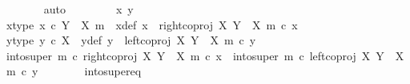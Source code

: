\begin{isabellebody}
\ \ \ \ \ \ \isamarkupfalse%
\ auto\isanewline
\ \ \isamarkupfalse%
\isanewline
\ \ \ \ \isamarkupfalse%
\ x{\isacharprime}{\kern0pt}\ y{\isacharprime}{\kern0pt}\isanewline
\ \ \ \ \isamarkupfalse%
\ x{\isacharprime}{\kern0pt}{\isacharunderscore}{\kern0pt}type{\isacharcolon}{\kern0pt}\ {\isachardoublequoteopen}x{\isacharprime}{\kern0pt}\ {\isasymin}\isactrlsub c\ Y\ {\isasymsetminus}\ {\isacharparenleft}{\kern0pt}X{\isacharcomma}{\kern0pt}\ m{\isacharparenright}{\kern0pt}{\isachardoublequoteclose}\ \ x{\isacharunderscore}{\kern0pt}def{\isacharcolon}{\kern0pt}\ {\isachardoublequoteopen}x\ {\isacharequal}{\kern0pt}\ right{\isacharunderscore}{\kern0pt}coproj\ X\ {\isacharparenleft}{\kern0pt}Y\ {\isasymsetminus}\ {\isacharparenleft}{\kern0pt}X{\isacharcomma}{\kern0pt}\ m{\isacharparenright}{\kern0pt}{\isacharparenright}{\kern0pt}\ {\isasymcirc}\isactrlsub c\ x{\isacharprime}{\kern0pt}{\isachardoublequoteclose}\isanewline
\ \ \ \ \isamarkupfalse%
\ y{\isacharprime}{\kern0pt}{\isacharunderscore}{\kern0pt}type{\isacharcolon}{\kern0pt}\ {\isachardoublequoteopen}y{\isacharprime}{\kern0pt}\ {\isasymin}\isactrlsub c\ X{\isachardoublequoteclose}\ \ y{\isacharunderscore}{\kern0pt}def{\isacharcolon}{\kern0pt}\ {\isachardoublequoteopen}y\ {\isacharequal}{\kern0pt}\ left{\isacharunderscore}{\kern0pt}coproj\ X\ {\isacharparenleft}{\kern0pt}Y\ {\isasymsetminus}\ {\isacharparenleft}{\kern0pt}X{\isacharcomma}{\kern0pt}\ m{\isacharparenright}{\kern0pt}{\isacharparenright}{\kern0pt}\ {\isasymcirc}\isactrlsub c\ y{\isacharprime}{\kern0pt}{\isachardoublequoteclose}\isanewline
\isanewline
\ \ \ \ \isamarkupfalse%
\ {\isachardoublequoteopen}into{\isacharunderscore}{\kern0pt}super\ m\ {\isasymcirc}\isactrlsub c\ right{\isacharunderscore}{\kern0pt}coproj\ X\ {\isacharparenleft}{\kern0pt}Y\ {\isasymsetminus}\ {\isacharparenleft}{\kern0pt}X{\isacharcomma}{\kern0pt}\ m{\isacharparenright}{\kern0pt}{\isacharparenright}{\kern0pt}\ {\isasymcirc}\isactrlsub c\ x{\isacharprime}{\kern0pt}\ {\isacharequal}{\kern0pt}\ into{\isacharunderscore}{\kern0pt}super\ m\ {\isasymcirc}\isactrlsub c\ left{\isacharunderscore}{\kern0pt}coproj\ X\ {\isacharparenleft}{\kern0pt}Y\ {\isasymsetminus}\ {\isacharparenleft}{\kern0pt}X{\isacharcomma}{\kern0pt}\ m{\isacharparenright}{\kern0pt}{\isacharparenright}{\kern0pt}\ {\isasymcirc}\isactrlsub c\ y{\isacharprime}{\kern0pt}{\isachardoublequoteclose}\isanewline
\ \ \ \ \ \ \isamarkupfalse%
\ into{\isacharunderscore}{\kern0pt}super{\isacharunderscore}{\kern0pt}eq\ \isamarkupfalse%

\end{isabellebody}
